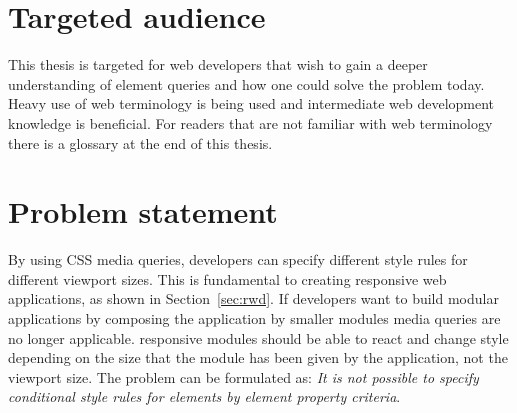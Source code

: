 \documentclass[a4paper,11pt]{kth-mag}
\newcommand{\problemformulation}{\emph{It is not possible to specify conditional style rules for \glspl{element} by element property criteria}}
\begin{document}
    \section{Targeted audience}
      This thesis is targeted for \gls{web} developers that wish to gain a deeper understanding of element queries and how one could solve the problem today.
      Heavy use of \gls{web} terminology is being used and intermediate \gls{web} development knowledge is beneficial.
      For readers that are not familiar with \gls{web} terminology there is a glossary at the end of this thesis.
    \section{Problem statement}\label{sec:problem}
      By using \gls{CSS} \gls{media queries}, developers can specify different style rules for different \gls{viewport} sizes.
      This is fundamental to creating \gls{responsive} \gls{web} applications, as shown in Section~\ref{sec:rwd}.
      If developers want to build modular applications by composing the application by smaller modules \gls{media queries} are no longer applicable.
      \Gls{responsive} modules should be able to react and change style depending on the size that the module has been given by the application, not the \gls{viewport} size. 
      The problem can be formulated as: \problemformulation.
\end{document}
